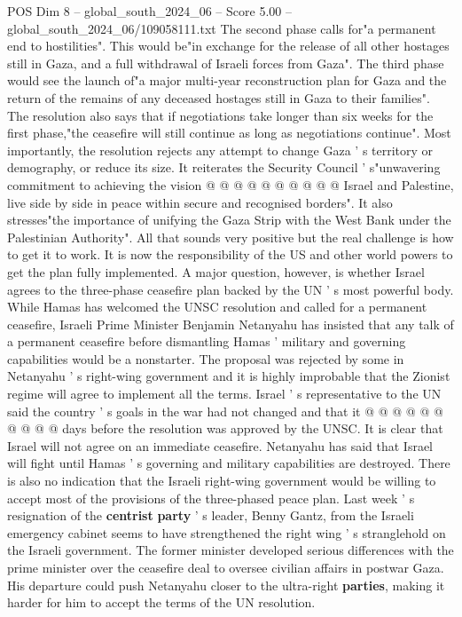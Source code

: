 \begin{textsample}{POS Dim 8 – global\_south\_2024\_06 – Score 5.00 – global\_south\_2024\_06/109058111.txt}
The second phase calls for"a permanent end to hostilities".
This would be"in exchange for the release of all other hostages still in Gaza, and a full withdrawal of Israeli forces from Gaza".
The third phase would see the launch of"a major multi-year reconstruction plan for Gaza and the return of the remains of any deceased hostages still in Gaza to their families".
The resolution also says that if negotiations take longer than six weeks for the first phase,"the ceasefire will still continue as long as negotiations continue".
Most importantly, the resolution rejects any attempt to change Gaza ' s territory or demography, or reduce its size.
It reiterates the Security Council ' s"unwavering commitment to achieving the vision @ @ @ @ @ @ @ @ @ @ Israel and Palestine, live side by side in peace within secure and recognised borders".
It also stresses"the importance of unifying the Gaza Strip with the West Bank under the Palestinian Authority".
All that sounds very positive but the real challenge is how to get it to work.
It is now the responsibility of the US and other world powers to get the plan fully implemented.
A major question, however, is whether Israel agrees to the three-phase ceasefire plan backed by the UN ' s most powerful body.
While Hamas has welcomed the UNSC resolution and called for a permanent ceasefire, Israeli Prime Minister Benjamin Netanyahu has insisted that any talk of a permanent ceasefire before dismantling Hamas ' military and governing capabilities would be a nonstarter.
The proposal was rejected by some in Netanyahu ' s right-wing government and it is highly improbable that the Zionist regime will agree to implement all the terms.
Israel ' s representative to the UN said the country ' s goals in the war had not changed and that it @ @ @ @ @ @ @ @ @ @ days before the resolution was approved by the UNSC.
It is clear that Israel will not agree on an immediate ceasefire.
Netanyahu has said that Israel will fight until Hamas ' s governing and military capabilities are destroyed.
There is also no indication that the Israeli right-wing government would be willing to accept most of the provisions of the three-phased peace plan.
Last week ' s resignation of the \textbf{centrist} \textbf{party} ' s leader, Benny Gantz, from the Israeli emergency cabinet seems to have strengthened the right wing ' s stranglehold on the Israeli government.
The former minister developed serious differences with the prime minister over the ceasefire deal to oversee civilian affairs in postwar Gaza.
His departure could push Netanyahu closer to the ultra-right \textbf{parties}, making it harder for him to accept the terms of the UN resolution.

\end{textsample}
